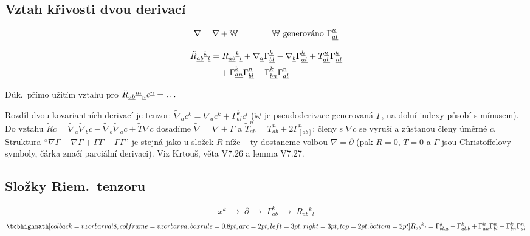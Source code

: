 \subsection*{Vztah křivosti dvou derivací}
\[
  \tilde\nabla = \nabla + \mathbb{W} \qquad\qquad \mathbb{W}\ \text{generováno}\ \Gamma^{\gmIjedenactAu{n}}_{\gmIjedenactAu{al}}
\]
\begin{veta}
\begin{align*}
  \tilde R_{\underline{ab}}{}^{\underline{k}}{}_{\underline{l}}
  &= R_{\underline{ab}}{}^{\underline{k}}{}_{\underline{l}}
   + \nabla_{\underline{a}}\Gamma^{\underline{k}}_{\underline{bl}}
   - \nabla_{\underline{b}}\Gamma^{\underline{k}}_{\underline{al}}
   + T^{\underline{n}}_{\underline{ab}}\Gamma^{\underline{k}}_{\underline{nl}} \\
  &\quad + \Gamma^{\underline{k}}_{\underline{an}}\Gamma^{\underline{n}}_{\underline{bl}}
   - \Gamma^{\underline{k}}_{\underline{bn}}\Gamma^{\underline{n}}_{\underline{al}}
\end{align*}
\end{veta}
Důk.\ přímo užitím vztahu pro $\tilde R_{\underline{ab}}{}^{\underline{m}}{}_{\underline{n}}c^{\underline{n}} = \dots$

\begin{vysvetleni}
Rozdíl dvou kovariantních derivací je tenzor: $\tilde\nabla_{a}c^{k}=\nabla_{a}c^{k}+\Gamma^{k}_{al}c^{l}$ ($\mathbb{W}$ je pseudoderivace generovaná $\Gamma$, na dolní indexy působí s mínusem). Do vztahu $\tilde R c=\tilde\nabla_a\tilde\nabla_b c-\tilde\nabla_b\tilde\nabla_a c+\tilde T\nabla c$ dosadíme $\tilde\nabla=\nabla+\Gamma$ a $\tilde T^{n}_{ab}=T^{n}_{ab}+2\Gamma^{n}_{[ab]}$; členy s $\nabla c$ se vyruší a zůstanou členy úměrné $c$.
Struktura ``$\nabla\Gamma-\nabla\Gamma+\Gamma\Gamma-\Gamma\Gamma$'' je stejná jako u složek $R$ níže -- ty dostaneme volbou $\nabla=\partial$ (pak $R=0$, $T=0$ a $\Gamma$ jsou Christoffelovy symboly, čárka značí parciální derivaci). Viz Krtouš, věta V7.26 a lemma V7.27.
\end{vysvetleni}

\subsection*{Složky Riem.\ tenzoru}
\[
  x^{k} \;\longrightarrow\; \partial \;\longrightarrow\; \Gamma^{k}_{ab} \;\longrightarrow\; R_{ab}{}^{k}{}_{l}
\]
\[
  \vzorec{R_{ab}{}^{k}{}_{l} = \Gamma^{k}_{bl,a} - \Gamma^{k}_{al,b} + \Gamma^{k}_{an}\Gamma^{n}_{bl} - \Gamma^{k}_{bn}\Gamma^{n}_{al}}
\]

